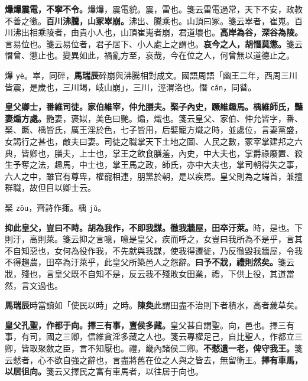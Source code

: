 \textbf{爗爗震電，不寧不令。}{\footnotesize 爗爗，震電貌。震，雷也。箋云雷電過常，天下不安，政教不善之徵。}\textbf{百川沸騰，山冢崒崩。}{\footnotesize 沸出、騰乘也。山頂曰冢。箋云崒者，崔嵬。百川沸出相乘陵者，由貴小人也，山頂崔嵬者崩，君道壞也。}\textbf{高岸為谷，深谷為陵。}{\footnotesize 言易位也。箋云易位者，君子居下、小人處上之謂也。}\textbf{哀今之人，胡憯莫懲。}{\footnotesize 箋云憯曾、懲止也。變異如此，禍亂方至，哀哉，今在位之人，何曾無以道德止之。}

\begin{quoting}爗 \texttt{yè}。崒，同碎，\textbf{馬瑞辰}碎崩與沸騰相對成文。國語周語「幽王二年，西周三川皆震，是歲也，三川竭，岐山崩」，三川，涇渭洛也。憯 \texttt{cǎn}，同朁。\end{quoting}

\textbf{皇父卿士，番維司徒。家伯維宰，仲允膳夫。棸子內史，蹶維趣馬。楀維師氏，豔妻煽方處。}{\footnotesize 艷妻，褒姒，美色曰艷。煽，熾也。箋云皇父、家伯、仲允皆字，番、棸、蹶、楀皆氏，厲王淫於色，七子皆用，后嬖寵方熾之時，並處位，言妻黨盛，女謁行之甚也，敵夫曰妻。司徒之職掌天下土地之圖、人民之數，冢宰掌建邦之六典，皆卿也，膳夫，上士也，掌王之飲食膳羞，內史，中大夫也，掌爵祿廢置、殺生予奪之法，趣馬，中士也，掌王馬之政，師氏，亦中大夫也，掌司朝得失之事，六人之中，雖官有尊卑，權寵相連，朋黨於朝，是以疾焉。皇父則為之端首，兼擅群職，故但目以卿士云。}

\begin{quoting}棸 \texttt{zōu}，齊詩作掫。楀 \texttt{jǔ}。\end{quoting}

\textbf{抑此皇父，豈曰不時。胡為我作，不即我謀。徹我牆屋，田卒汙萊。}{\footnotesize 時，是也。下則汙，高則萊。箋云抑之言噫，噫是皇父，疾而呼之，女豈曰我所為不是乎，言其不自知惡也，女何為役作我，不先就與我謀，使我得遷徙，乃反徹毀我牆屋，令我不得趨農，田卒為汙萊乎，此皇父所築邑人之怨辭。}\textbf{曰予不戕，禮則然矣。}{\footnotesize 箋云戕，殘也，言皇父既不自知不是，反云我不殘敗女田業，禮，下供上役，其道當然，言文過也。}

\begin{quoting}\textbf{馬瑞辰}時當讀如「使民以時」之時。\textbf{陳奐}此謂田盡不治則下者積水，高者薉草矣。\end{quoting}

\textbf{皇父孔聖，作都于向。擇三有事，亶侯多藏。}{\footnotesize 皇父甚自謂聖。向，邑也。擇三有事，有司，國之三卿，信維貪淫多藏之人也。箋云專權足己，自比聖人，作都立三卿，皆取聚斂之臣，言不知厭也。禮，畿內諸侯二卿。}\textbf{不憖遺一老，俾守我王。}{\footnotesize 箋云憖者，心不欲自強之辭也，言盡將舊在位之人與之皆去，無留衛王。}\textbf{擇有車馬，以居徂向。}{\footnotesize 箋云又擇民之富有車馬者，以往居于向也。}


